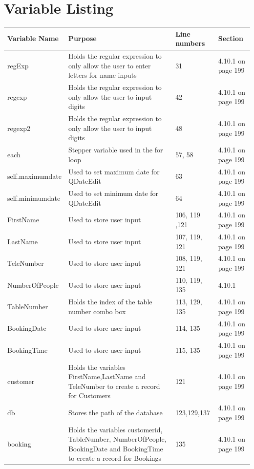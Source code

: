 \section{Variable Listing}

\begin{center}
\begin{longtable}{|p{3cm}|p{4.5cm}|p{3cm}|p{1cm}|}
\hline
\textbf{Variable Name} & \textbf{Purpose} & \textbf{Line numbers} & \textbf{Section} \\ \hline
regExp & Holds the regular expression to only allow the user to enter letters for name inputs & 31 & 4.10.1 on page 199\\ \hline
regexp & Holds the regular expression to only allow the user to input digits & 42 &4.10.1 on page 199 \\ \hline
regexp2 & Holds the regular expression to only allow the user to input digits & 48 &4.10.1 on page 199 \\ \hline
each & Stepper variable used in the for loop &57, 58 &4.10.1 on page 199 \\ \hline
self.maximumdate&Used to set maximum date for QDateEdit &63 &4.10.1 on page 199 \\ \hline
self.minimumdate&Used to set minimum date for QDateEdit &64 &4.10.1 on page 199 \\ \hline
FirstName&Used to store user input &106, 119 ,121 &4.10.1 on page 199 \\ \hline
LastName & Used to store user input & 107, 119, 121 &4.10.1  on page 199\\ \hline
TeleNumber&Used to store user input  &108, 119, 121 & 4.10.1 on page 199\\ \hline
NumberOfPeople&Used to store user input &110, 119, 135 & 4.10.1\\ \hline
TableNumber&Holds the index of the table number combo box &113, 129, 135 &4.10.1 on page 199 \\ \hline
BookingDate & Used to store user input & 114, 135 & 4.10.1 on page 199\\ \hline
BookingTime&Used to store user input &115, 135 & 4.10.1 on page 199\\ \hline
customer&Holds the variables FirstName,LastName and TeleNumber to create a record for Customers &121 & 4.10.1 on page 199\\ \hline
db&Stores the path of the database &123,129,137 & 4.10.1 on page 199\\ \hline
booking& Holds the variables customerid, TableNumber, NumberOfPeople, BookingDate and BookingTime to create a record for Bookings& 135 &4.10.1 on page 199 \\ \hline

\end{longtable}
\end{center}
